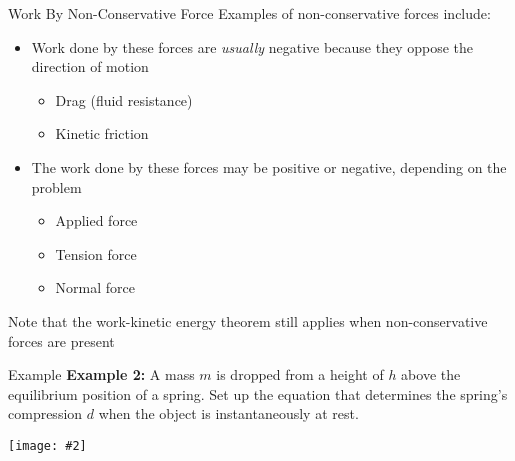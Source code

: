 \documentclass[12pt,compress,aspectratio=169]{beamer}
\newcommand{\pic}[2]{\texttt{[image: \#2]}}
\begin{document}
\begin{frame}{Work By Non-Conservative Force}
  Examples of non-conservative forces include:
  \begin{itemize}
  \item Work done by these forces are \emph{usually} negative because they
    oppose the direction of motion
    \begin{itemize}
    \item Drag (fluid resistance)
    \item Kinetic friction
    \end{itemize}
  \item The work done by these forces may be positive or negative, depending on
    the problem
    \begin{itemize}
    \item Applied force
    \item Tension force
    \item Normal force
    \end{itemize}
  \end{itemize}
  Note that the work-kinetic energy theorem still applies when non-conservative
  forces are present
\end{frame}


\begin{frame}{Example}
  \textbf{Example 2:} A mass $m$ is dropped from a height of $h$ above the
  equilibrium position of a spring. Set up the equation that determines the
  spring's compression $d$ when the object is instantaneously at rest.
  \begin{center}
    \pic{.35}{spring-example1.png}
  \end{center}
\end{frame}


\end{document}
